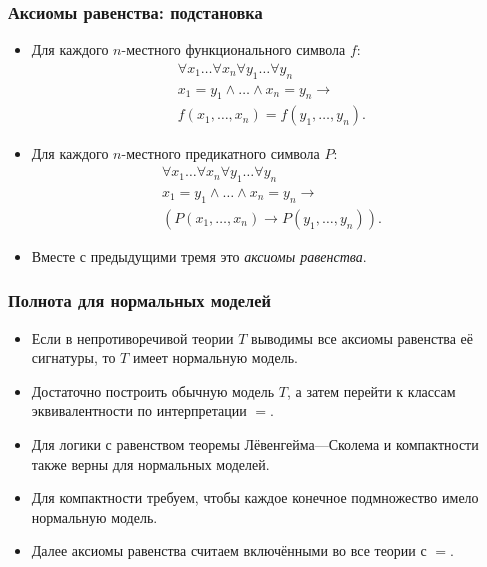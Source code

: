 \documentclass[10pt]{beamer}
\begin{document}
\begin{frame}
    \frametitle{Аксиомы равенства: подстановка}
    \begin{itemize}
        \item Для каждого $n$-местного функционального символа $f$:
        \[
        \begin{gathered}
            \forall x_1\ldots\forall x_n\forall y_1\ldots\forall y_n\\
            x_1=y_1\land\ldots\land x_n=y_n\to\\
            f(x_1,\ldots,x_n)=f(y_1,\ldots,y_n).
        \end{gathered}
        \]
        \pause
        \item Для каждого $n$-местного предикатного символа $P$:
        \[
        \begin{gathered}
            \forall x_1\ldots\forall x_n\forall y_1\ldots\forall y_n\\
            x_1=y_1\land\ldots\land x_n=y_n\to\\
            (P(x_1,\ldots,x_n)\to P(y_1,\ldots,y_n)).
        \end{gathered}
        \]
        \item Вместе с предыдущими тремя это \emph{аксиомы равенства}.
    \end{itemize}
\end{frame}

\begin{frame}
    \frametitle{Полнота для нормальных моделей}
    \begin{itemize}
        \item Если в непротиворечивой теории $T$ выводимы все аксиомы равенства её сигнатуры, то $T$ имеет нормальную модель. \pause
        \item Достаточно построить обычную модель $T$, а затем перейти к классам эквивалентности по интерпретации $=$.
        \item Для логики с равенством теоремы Лёвенгейма---Сколема и компактности также верны для нормальных моделей.
        \item Для компактности требуем, чтобы каждое конечное подмножество имело нормальную модель.
        \item Далее аксиомы равенства считаем включёнными во все теории с $=$.
    \end{itemize}
\end{frame}
\end{document}
